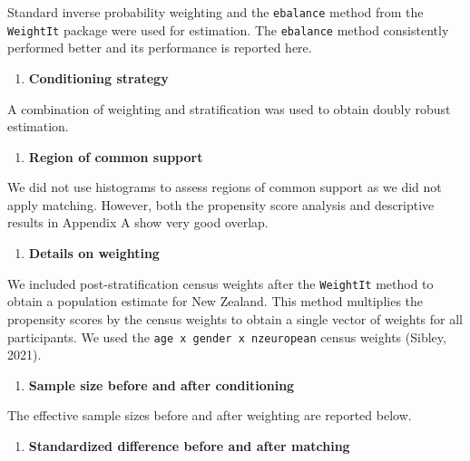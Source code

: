 \documentclass[
  singlecolumn]{report}
\providecommand{\tightlist}{%
  \setlength{\itemsep}{0pt}\setlength{\parskip}{0pt}}\usepackage{longtable,booktabs,array}
\begin{document}
Standard inverse probability weighting and the \texttt{ebalance} method
from the \texttt{WeightIt} package were used for estimation. The
\texttt{ebalance} method consistently performed better and its
performance is reported here.

\begin{enumerate}
\def\labelenumi{\arabic{enumi}.}
\setcounter{enumi}{4}
\tightlist
\item
  \textbf{Conditioning strategy}
\end{enumerate}

A combination of weighting and stratification was used to obtain doubly
robust estimation.

\begin{enumerate}
\def\labelenumi{\arabic{enumi}.}
\setcounter{enumi}{5}
\tightlist
\item
  \textbf{Region of common support}
\end{enumerate}

We did not use histograms to assess regions of common support as we did
not apply matching. However, both the propensity score analysis and
descriptive results in Appendix A show very good overlap.

\begin{enumerate}
\def\labelenumi{\arabic{enumi}.}
\setcounter{enumi}{6}
\tightlist
\item
  \textbf{Details on weighting}
\end{enumerate}

We included post-stratification census weights after the
\texttt{WeightIt} method to obtain a population estimate for New
Zealand. This method multiplies the propensity scores by the census
weights to obtain a single vector of weights for all participants. We
used the \texttt{age\ x\ gender\ x\ nzeuropean} census weights (Sibley,
2021).

\begin{enumerate}
\def\labelenumi{\arabic{enumi}.}
\setcounter{enumi}{7}
\tightlist
\item
  \textbf{Sample size before and after conditioning}
\end{enumerate}

The effective sample sizes before and after weighting are reported
below.

\begin{enumerate}
\def\labelenumi{\arabic{enumi}.}
\setcounter{enumi}{8}
\tightlist
\item
  \textbf{Standardized difference before and after matching}
\end{enumerate}
\end{document}
